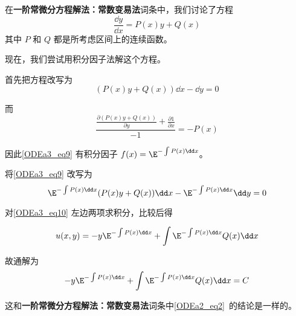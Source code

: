 \begin{example}{}
在\textbf{一阶常微分方程解法：常数变易法}词条中，我们讨论了方程
\begin{equation}
\frac{\dd y}{\dd x}=P(x)y+Q(x)
\end{equation}
其中 $P$ 和 $Q$ 都是所考虑区间上的连续函数。

现在，我们尝试用积分因子法解这个方程。

首先把方程改写为
\begin{equation}\label{ODEa3_eq9}
(P(x)y+Q(x))\dd x-\dd y=0
\end{equation}

而
\begin{equation}
\frac{\frac{\partial (P(x)y+Q(x))}{\partial y}+\frac{\partial 1}{\partial x}}{-1}=-P(x)
\end{equation}

因此\autoref{ODEa3_eq9} 有积分因子 $f(x)=\E^{-\int P(x)\dd x}
$。

将\autoref{ODEa3_eq9} 改写为
\begin{equation}\label{ODEa3_eq10}
\E^{-\int P(x)\dd x}(P(x)y+Q(x))\dd x-\E^{-\int P(x)\dd x}\dd y=0
\end{equation}

对\autoref{ODEa3_eq10} 左边两项求积分，比较后得

\begin{equation}
u(x, y)=-y\E^{-\int P(x)\dd x}+\int  \E^{-\int P(x)\dd x}Q(x)  \dd x
\end{equation}

故通解为
\begin{equation}
-y\E^{-\int P(x)\dd x}+\int  \E^{-\int P(x)\dd x}Q(x)  \dd x=C
\end{equation}

这和\textbf{一阶常微分方程解法：常数变易法}词条中\autoref{ODEa2_eq2}~的结论是一样的。

\end{example}














